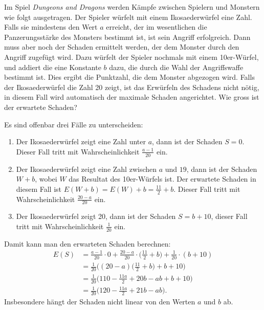 Im Spiel {\it Dungeons and Dragons} werden Kämpfe zwischen Spielern und
Monstern wie folgt ausgetragen.
Der Spieler würfelt mit einem Ikosaederwürfel eine Zahl.
Falls sie mindestens den Wert
$a$ erreicht, der im wesentlichen die Panzerungsstärke
des Monsters bestimmt ist, ist sein Angriff erfolgreich. Dann muss aber noch der
Schaden ermittelt werden, der dem Monster durch den Angriff zugefügt wird.
Dazu würfelt der Spieler nochmals mit einem 10er-Würfel, und addiert die
eine Konstante $b$ dazu, die durch die Wahl der Angriffswaffe bestimmt ist.
Dies ergibt die Punktzahl, die dem Monster abgezogen wird.
Falls der Ikosaederwürfel die Zahl 20 zeigt, ist das Erwürfeln des
Schadens nicht nötig, in diesem Fall wird automatisch der maximale
Schaden angerichtet. Wie gross ist der erwartete Schaden?

\begin{loesung}
Es sind offenbar drei Fälle zu unterscheiden:
\begin{enumerate}
\item Der Ikosaederwürfel zeigt eine Zahl unter $a$, dann ist der Schaden
$S=0$. Dieser Fall tritt mit Wahrscheinlichkeit $\frac{a-1}{20}$ ein.
\item Der Ikosaederwürfel zeigt eine Zahl zwischen $a$ und $19$,
dann ist der Schaden $W+b$, wobei $W$ das Resultat des 10er-Würfels ist.
Der erwartete Schaden in diesem Fall ist $E(W+b)=E(W)+b=\frac{11}2 + b$.
Dieser Fall tritt mit Wahrscheinlichkeit $\frac{20-a}{20}$ ein.
\item Der Ikosaederwürfel zeigt 20, dann ist der Schaden $S=b + 10$,
dieser Fall tritt mit Wahrscheinlichkeit $\frac1{20}$ ein.
\end{enumerate}
Damit kann man den erwarteten Schaden berechnen:
\begin{align*}
E(S)&=\frac{a-1}{20}\cdot 0 + \frac{20-a}{20}\cdot \biggl(\frac{11}2+b\biggr)
+\frac1{20}\cdot (b+10)
\\
&=
\frac1{20}\biggl(
(20-a)\biggl(\frac{11}2+b\biggr)+b+10
\biggr)
\\
&=
\frac1{20}\biggl(
110 -\frac{11a}2+20b-ab + b + 10
\biggr)
\\
&=
\frac1{20}\biggl(
120 -\frac{11a}2+21b-ab
\biggr).
\end{align*}
Insbesondere hängt der Schaden nicht linear von den Werten $a$ und $b$ ab.
\end{loesung}
